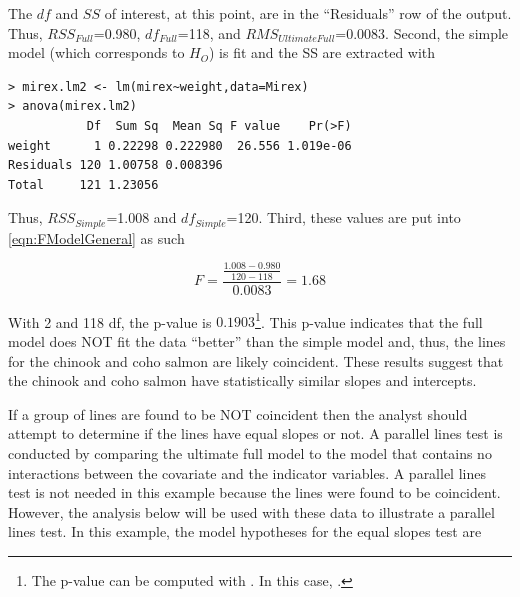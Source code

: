 \documentclass[10pt,openany]{book}\usepackage[]{graphicx}\usepackage[]{color}
\makeatletter
\newenvironment{kframe}{%
 \def\at@end@of@kframe{}%
 \ifinner\ifhmode%
  \def\at@end@of@kframe{\end{minipage}}%
  \begin{minipage}{\columnwidth}%
 \fi\fi%
 \def\FrameCommand##1{\hskip\@totalleftmargin \hskip-\fboxsep
 \colorbox{shadecolor}{##1}\hskip-\fboxsep
     \hskip-\linewidth \hskip-\@totalleftmargin \hskip\columnwidth}%
 \MakeFramed {\advance\hsize-\width
   \@totalleftmargin\z@ \linewidth\hsize
   \@setminipage}}%
 {\par\unskip\endMakeFramed%
 \at@end@of@kframe}
\newenvironment{knitrout}{}{} %
\makeatother
\begin{document}
The $df$ and $SS$ of interest, at this point, are in the ``Residuals'' row of the output.  Thus, $RSS_{Full}$=0.980, $df_{Full}$=118, and $RMS_{Ultimate Full}$=0.0083.  Second, the simple model (which corresponds to $H_{O}$) is fit and the SS are extracted with

\begin{knitrout}
\color{fgcolor}\begin{kframe}
\begin{verbatim}
> mirex.lm2 <- lm(mirex~weight,data=Mirex)
> anova(mirex.lm2)
           Df  Sum Sq  Mean Sq F value    Pr(>F)
weight      1 0.22298 0.222980  26.556 1.019e-06
Residuals 120 1.00758 0.008396                  
Total     121 1.23056                           
\end{verbatim}
\end{kframe}
\end{knitrout}

Thus, $RSS_{Simple}$=1.008 and $df_{Simple}$=120.  Third, these values are put into \eqref{eqn:FModelGeneral} as such

\[ F = \frac{\frac{1.008-0.980}{120-118}}{0.0083} = 1.68 \]

With 2 and 118 df, the p-value is $0.1903$\footnote{The p-value can be computed with .  In this case, .}.  This p-value indicates that the full model does NOT fit the data ``better'' than the simple model and, thus, the lines for the chinook and coho salmon are likely coincident.  These results suggest that the chinook and coho salmon have statistically similar slopes and intercepts.


\vspace{-12pt}

If a group of lines are found to be NOT coincident then the analyst should attempt to determine if the lines have equal slopes or not.  A parallel lines test is conducted by comparing the ultimate full model to the model that contains no interactions between the covariate and the indicator variables.  A parallel lines test is not needed in this example because the lines were found to be coincident.  However, the analysis below will be used with these data to illustrate a parallel lines test.  In this example, the model hypotheses for the equal slopes test are
\end{document}
